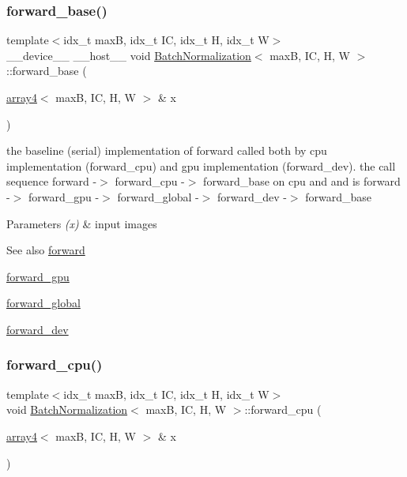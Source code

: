 \subsubsection{\texorpdfstring{forward\+\_\+base()}{forward\_base()}}
{\footnotesize\ttfamily template$<$idx\+\_\+t maxB, idx\+\_\+t IC, idx\+\_\+t H, idx\+\_\+t W$>$ \\
\+\_\+\+\_\+device\+\_\+\+\_\+ \+\_\+\+\_\+host\+\_\+\+\_\+ void \hyperlink{structBatchNormalization}{Batch\+Normalization}$<$ maxB, IC, H, W $>$\+::forward\+\_\+base (\begin{DoxyParamCaption}\item[{\hyperlink{structarray4}{array4}$<$ maxB, IC, H, W $>$ \&}]{x }\end{DoxyParamCaption})\hspace{0.3cm}{\ttfamily [inline]}}



the baseline (serial) implementation of forward called both by cpu implementation (forward\+\_\+cpu) and gpu implementation (forward\+\_\+dev). the call sequence forward -\/$>$ forward\+\_\+cpu -\/$>$ forward\+\_\+base on cpu and and is forward -\/$>$ forward\+\_\+gpu -\/$>$ forward\+\_\+global -\/$>$ forward\+\_\+dev -\/$>$ forward\+\_\+base 


\begin{DoxyParams}{Parameters}
{\em (x)} & input images \\
\hline
\end{DoxyParams}
\begin{DoxySeeAlso}{See also}
\hyperlink{structBatchNormalization_a315cda9d48dfa18a2f4f65ac7bb3b891}{forward} 

\hyperlink{structBatchNormalization_a66c02d8d49ae80a8edd186024c04d42a}{forward\+\_\+gpu} 

\hyperlink{softmaxcrossentropy_8h_a578aeeb166bd06e800d9b396eab48b35}{forward\+\_\+global} 

\hyperlink{structBatchNormalization_a5c35968b76ca1a166fe93aede17b53e8}{forward\+\_\+dev} 
\end{DoxySeeAlso}
\mbox{\label{structBatchNormalization_a9490250c2e3469b619e76e5c913aa830}} 
\subsubsection{\texorpdfstring{forward\+\_\+cpu()}{forward\_cpu()}}
{\footnotesize\ttfamily template$<$idx\+\_\+t maxB, idx\+\_\+t IC, idx\+\_\+t H, idx\+\_\+t W$>$ \\
void \hyperlink{structBatchNormalization}{Batch\+Normalization}$<$ maxB, IC, H, W $>$\+::forward\+\_\+cpu (\begin{DoxyParamCaption}\item[{\hyperlink{structarray4}{array4}$<$ maxB, IC, H, W $>$ \&}]{x }\end{DoxyParamCaption})\hspace{0.3cm}{\ttfamily [inline]}}



